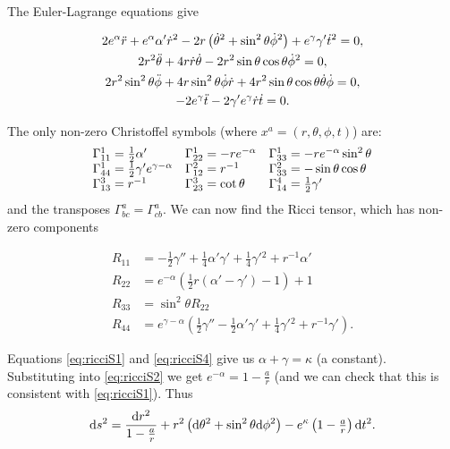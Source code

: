 \documentclass{notes}
\begin{document}
The Euler-Lagrange equations give

\begin{gather}
  2 e^\alpha \Ddot{r} + e^\alpha \alpha' \Dot{r}^2 - 2 r \left(
    \Dot{\theta}^2 + \sin^2 \theta \Dot{\phi}^2 \right) + e^\gamma
  \gamma' \Dot{t}^2 = 0, \\
  2 r^2 \Ddot{\theta} + 4 r \Dot{r} \Dot{\theta} - 2 r^2 \sin \theta
  \cos \theta \Dot{\phi}^2 = 0, \label{eq:ELschwartz2}\\
  2 r^2 \sin^2 \theta \Ddot{\phi} + 4 r \sin^2 \theta \Dot{\phi}
  \Dot{r} + 4 r^2 \sin \theta \cos \theta \Dot{\theta} \Dot{\phi} = 0, \\
  -2 e^\gamma \Ddot{t} - 2 \gamma' e^{\gamma} \Dot{r} \Dot{t} = 0.
\end{gather}

The only non-zero Christoffel symbols (where $x^a =
(r,\theta,\phi,t)$) are:
\[
\begin{array}{l l l}
\Gamma^1_{11} = \tfrac{1}{2} \alpha' & \Gamma^1_{22} = -r e^{-\alpha}
& \Gamma^1_{33} = - r e^{-\alpha} \sin^2 \theta \\
\Gamma^1_{44} = \tfrac{1}{2} \gamma' e^{\gamma - \alpha} &
\Gamma^2_{12} = r^{-1} & \Gamma^2_{33} = - \sin \theta \cos \theta \\
\Gamma^3_{13} = r^{-1} & \Gamma^3_{23} = \cot \theta
& \Gamma^4_{14} = \tfrac{1}{2} \gamma'
\end{array}
\]
and the transposes $\Gamma^a_{bc} = \Gamma^a_{cb}$.  We can now
find the Ricci tensor, which has non-zero components

\begin{align}
R_{11} &= - \tfrac{1}{2} \gamma'' + \tfrac{1}{4} \alpha' \gamma'
+ \tfrac{1}{4} \gamma'{}^2 + r^{-1} \alpha' \label{eq:ricciS1} \\
R_{22} &= e^{-\alpha} \left( \tfrac{1}{2} r (\alpha' - \gamma') - 1
\right) + 1 \label{eq:ricciS2} \\
R_{33} &= \sin^2 \theta R_{22} \label{eq:ricciS3} \\
R_{44} &= e^{\gamma - \alpha} \left( \tfrac{1}{2} \gamma''
- \tfrac{1}{2} \alpha' \gamma' + \tfrac{1}{4} \gamma'{}^2
+ r^{-1} \gamma'\right) \label{eq:ricciS4}.
\end{align}

Equations \eqref{eq:ricciS1} and \eqref{eq:ricciS4}
give us $\alpha + \gamma = \kappa$ (a constant).  Substituting into
\eqref{eq:ricciS2} we get $e^{-\alpha} = 1 - \tfrac{a}{r}$
(and we can check that this is consistent with \eqref{eq:ricciS1}).
Thus
\[
\mathrm{d} s^2 = \frac{\mathrm{d} r^2}{1 - \tfrac{a}{r}} + r^2 \left(
\mathrm{d} \theta^2 + \sin^2 \theta \mathrm{d} \phi^2 \right) - e^{\kappa}
\left( 1 - \tfrac{a}{r} \right) \mathrm{d} t^2.
\]
\end{document}
